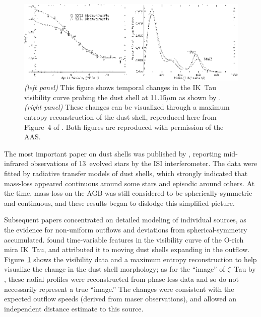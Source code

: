 \documentclass[12pt]{article}
\begin{document}
\begin{figure}[tbhp]
\begin{center}
\includegraphics[clip,angle=0,width=5.0in]{Figures/JDM_hale1997.eps}
\caption{\footnotesize {\em (left panel)} This figure shows temporal 
  changes in the IK~Tau visibility curve probing the dust shell at
  11.15$\mu$m as shown by \citet[][Figure~3]{hale1997}.  {\em (right
    panel)} These changes can be visualized through a maximum entropy
  reconstruction of the dust shell, reproduced here from Figure~4 of
  \citet{hale1997}. Both figures are reproduced with permission of the
  AAS.
\label{hale1997}}
\end{center}
\end{figure}

The most important paper on dust shells was published by
\citet{danchi1994}, reporting mid-infrared observations of 13~evolved
stars by the ISI interferometer.  The data were fitted by radiative
transfer models of dust shells, which strongly indicated that
mass-loss appeared continuous around some stars and episodic around
others.  At the time, mass-loss on the AGB was still considered to be
spherically-symmetric and continuous, and these results began to
dislodge this simplified picture.

Subsequent papers concentrated on detailed modeling of individual
sources, as the evidence for non-uniform outflows \citep{monnier1997}
and deviations from spherical-symmetry \citep{lopez1997} accumulated.
\citet{hale1997} found time-variable features in the visibility curve
of the O-rich mira IK~Tau, and attributed it to moving dust shells
expanding in the outflow.  Figure~\ref{hale1997} shows the visibility
data and a maximum entropy reconstruction to help visualize the change
in the dust shell morphology; as for the ``image'' of $\zeta$~Tau by
\citet{quirrenbach1994}, these radial profiles were reconstructed from
phase-less data and so do not necessarily represent a true ``image.''
The changes were consistent with the expected outflow speeds (derived
from maser observations), and allowed an independent
distance estimate to this source.
\end{document}
